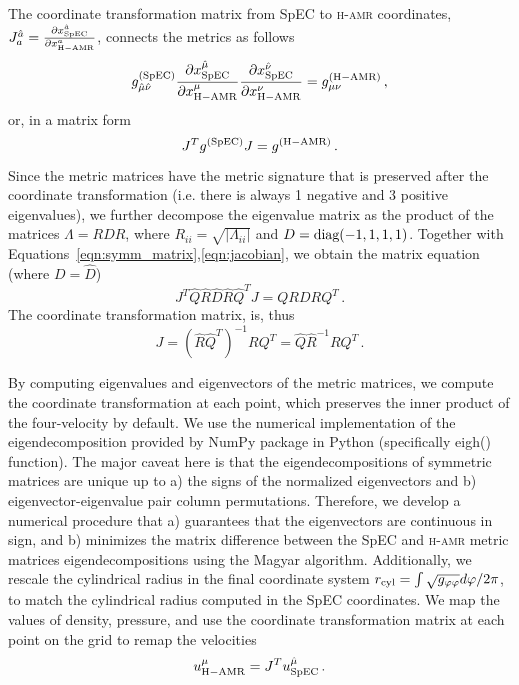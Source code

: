 \documentclass[twocolumn,dvipsnames]{aastex62}
\begin{document}
The coordinate transformation matrix from SpEC to \textsc{h-amr} coordinates, $J^{\hat{a}}_{a} = \frac{\partial x^{\hat{a}}_{\rm SpEC}}{\partial x^a_{\rm H-AMR}}$, connects the metrics as follows
\begin{equation}
g^{\rm(SpEC)}_{\hat{\mu}\hat{\nu}} \frac{\partial x^{\hat{\mu}}_{\rm SpEC}}{\partial x^\mu_{\rm H-AMR}} \frac{\partial x^{\hat{\nu}}_{\rm SpEC}}{\partial x^\nu_{\rm H-AMR}} = g^{\rm (H-AMR)}_{\mu\nu}\,,
    \label{eqn:gcov_spec2hamr}
\end{equation}
or, in a matrix form
\begin{equation}
    J^T g^{\rm(SpEC)} J = g^{\rm (H-AMR)}\,.
    \label{eqn:jacobian}
\end{equation}
Since the metric matrices have the metric signature that is preserved after the coordinate transformation (i.e. there is always 1 negative and 3 positive eigenvalues), we further decompose the eigenvalue matrix as the product of the matrices $\Lambda = RDR$, where $R_{ii} = \sqrt{|\Lambda_{ii}|}$ and $D=\rm diag (-1,1,1,1)$. 
Together with Equations~\eqref{eqn:symm_matrix},\eqref{eqn:jacobian}, we obtain the matrix equation (where $D = \hat{D}$)
\begin{equation}
    J^T \hat{Q}\hat{R}\hat{D}\hat{R}\hat{Q}^T J = Q R D R Q^T\,.
\end{equation}
The coordinate transformation matrix, is, thus
\begin{equation}
    J = (\hat{R}\hat{Q}^T)^{-1} R Q^T = \hat{Q} \hat{R}^{-1} R Q^T\,.
\end{equation}

By computing eigenvalues and eigenvectors of the metric matrices, we compute the coordinate transformation at each point, which preserves the inner product of the four-velocity by default. We use the numerical implementation of the eigendecomposition provided by NumPy package in Python (specifically eigh() function). The major caveat here is that 
 the eigendecompositions of symmetric matrices are unique up to a) the signs of the normalized eigenvectors and b) eigenvector-eigenvalue pair column permutations. Therefore, we develop a numerical procedure that a) guarantees that the eigenvectors are continuous in sign, and b) minimizes the matrix difference between the SpEC and \textsc{h-amr} metric matrices eigendecompositions using the Magyar algorithm. Additionally, we rescale the cylindrical radius in the final coordinate system $r_{\rm cyl} = \int \sqrt{g_{\varphi\varphi}}d\varphi/2\pi$, to match the cylindrical radius computed in the SpEC coordinates. We map the values of density, pressure, and use the coordinate transformation matrix at each point on the grid to remap the velocities
\begin{equation}
    u^{\mu}_{\rm H-AMR} = J^T u^{\hat{\mu}}_{\rm SpEC}\,.    \label{eqn:velocityremap_spec2hamr}
\end{equation}
\end{document}
